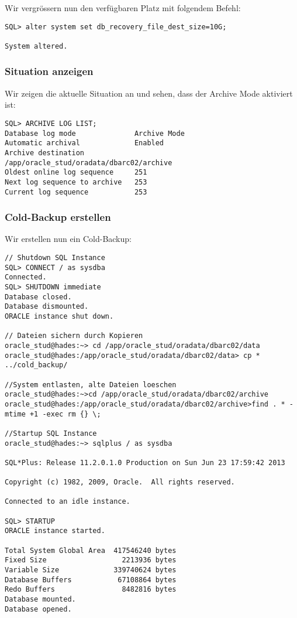 \documentclass[11pt,a4paper,parskip=half]{scrartcl}
\begin{document}
Wir vergrössern nun den verfügbaren Platz mit folgendem Befehl:
\begin{lstlisting}
SQL> alter system set db_recovery_file_dest_size=10G;

System altered.
\end{lstlisting}

\subsubsection{Situation anzeigen}
Wir zeigen die aktuelle Situation an und sehen, dass der Archive Mode aktiviert ist:
\begin{lstlisting}
SQL> ARCHIVE LOG LIST;
Database log mode              Archive Mode
Automatic archival             Enabled
Archive destination            /app/oracle_stud/oradata/dbarc02/archive
Oldest online log sequence     251
Next log sequence to archive   253
Current log sequence           253
\end{lstlisting}

\subsubsection{Cold-Backup erstellen}
Wir erstellen nun ein Cold-Backup:
\begin{lstlisting}
// Shutdown SQL Instance
SQL> CONNECT / as sysdba
Connected.
SQL> SHUTDOWN immediate
Database closed.
Database dismounted.
ORACLE instance shut down.

// Dateien sichern durch Kopieren
oracle_stud@hades:~> cd /app/oracle_stud/oradata/dbarc02/data
oracle_stud@hades:/app/oracle_stud/oradata/dbarc02/data> cp * ../cold_backup/

//System entlasten, alte Dateien loeschen
oracle_stud@hades:~>cd /app/oracle_stud/oradata/dbarc02/archive
oracle_stud@hades:/app/oracle_stud/oradata/dbarc02/archive>find . * -mtime +1 -exec rm {} \;

//Startup SQL Instance
oracle_stud@hades:~> sqlplus / as sysdba

SQL*Plus: Release 11.2.0.1.0 Production on Sun Jun 23 17:59:42 2013

Copyright (c) 1982, 2009, Oracle.  All rights reserved.

Connected to an idle instance.

SQL> STARTUP
ORACLE instance started.

Total System Global Area  417546240 bytes
Fixed Size                  2213936 bytes
Variable Size             339740624 bytes
Database Buffers           67108864 bytes
Redo Buffers                8482816 bytes
Database mounted.
Database opened.
\end{lstlisting}
\end{document}
